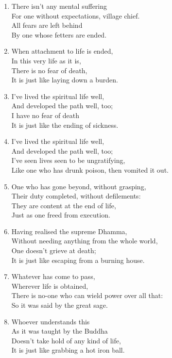\documentclass[10pt, openany]{book}
\newcommand*{\vleftofline}[1]{\leavevmode\llap{#1}}
\begin{document}
\begin{enumerate}
\item \vleftofline{“}There isn’t any mental suffering\\
For one without expectations, village chief.\\
All fears are left behind\\
By one whose fetters are ended.

\item When attachment to life is ended,\\
In this very life as it is,\\
There is no fear of death,\\
It is just like laying down a burden.

\item I’ve lived the spiritual life well,\\
And developed the path well, too;\\
I have no fear of death\\
It is just like the ending of sickness.

\item I’ve lived the spiritual life well,\\
And developed the path well, too;\\
I’ve seen lives seen to be ungratifying,\\
Like one who has drunk poison, then vomited it out.

\item One who has gone beyond, without grasping,\\
Their duty completed, without defilements:\\
They are content at the end of life,\\
Just as one freed from execution.

\item Having realised the supreme Dhamma,\\
Without needing anything from the whole world,\\
One doesn’t grieve at death;\\
It is just like escaping from a burning house.

\item Whatever has come to pass,\\
Wherever life is obtained,\\
There is no-one who can wield power over all that:\\
So it was said by the great sage.

\item Whoever understands this\\
As it was taught by the Buddha\\
Doesn’t take hold of any kind of life,\\
It is just like grabbing a hot iron ball.


\end{enumerate}
\end{document}
